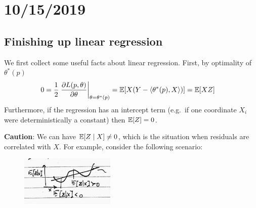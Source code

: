 \section{10/15/2019}

\subsection{Finishing up linear regression}

We first collect some useful facts about linear regression.
First, by optimality of $\theta^*(p)$
\begin{align}
  0
  &= \frac{1}{2} \left.\frac{\partial L(p, \theta)}{\partial \theta} \right\rvert_{\theta = \theta^*(p)}
  = \mathbb{E}[X (Y - \braket{\theta^*(p), X}) ]
  = \mathbb{E}[ X Z ]
\end{align}
Furthermore, if the regression has an intercept term (e.g.\ if one coordinate
$X_i$ were deterministically a constant) then $\mathbb{E}[Z] = 0$.

\textbf{Caution}: We can have $\mathbb{E}[Z \mid X] \neq 0$, which is the situation
when residuals are correlated with $X$. For example, consider the following
scenario:

\begin{figure}[H]
  \begin{center}
    \includegraphics[width=0.4\textwidth]{figures/10-15-1.png}
  \end{center}
\end{figure}

